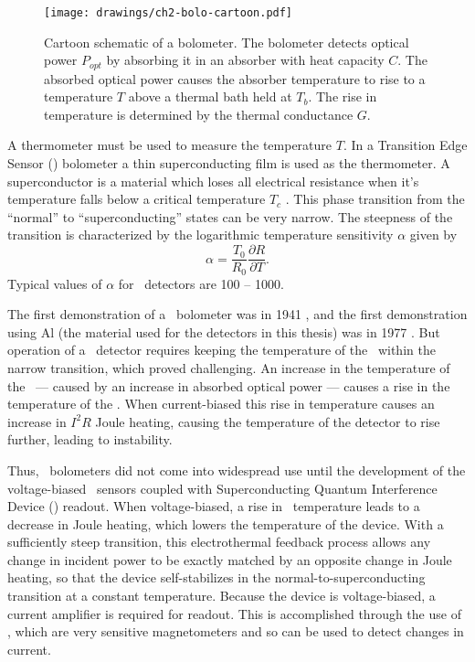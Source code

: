 \begin{figure*}
\centering
\texttt{[image: drawings/ch2-bolo-cartoon.pdf]}
\caption[Bolometer Schematic]{
  Cartoon schematic of a bolometer.
  The bolometer detects optical power $P_{opt}$ by absorbing it in an absorber with heat capacity $C$.
  The absorbed optical power causes the absorber temperature to rise to a temperature $T$ above a thermal bath held at $T_b$.
  The rise in temperature is determined by the thermal conductance $G$.
}
\label{fig:ch2-bolo-cartoon}
\end{figure*}

A thermometer must be used to measure the temperature $T$.
In a Transition Edge Sensor (\TES) bolometer a thin superconducting film is used as the thermometer.
A superconductor is a material which loses all electrical resistance when it's temperature falls below a critical temperature $T_c$ \cite{tinkham_introduction_1996}.
This phase transition from the ``normal'' to ``superconducting'' states can be very narrow.
The steepness of the transition is characterized by the logarithmic temperature sensitivity $\alpha$ given by
\begin{equation}
  \alpha = \frac{T_0}{R_0} \frac{\partial R}{\partial T}.
\end{equation}
Typical values of $\alpha$ for \TES\ detectors are 100 -- 1000.

The first demonstration of a \TES\ bolometer was in 1941 \cite{andrews_attenuated_1942}, and the first demonstration using Al (the material used for the detectors in this thesis) was in 1977 \cite{clarke_superconductive_1977}.
But operation of a \TES\ detector requires keeping the temperature of the \TES\ within the narrow transition, which proved challenging.
An increase in the temperature of the \TES\ --- caused by an increase in absorbed optical power --- causes a rise in the temperature of the \TES.
When current-biased this rise in temperature causes an increase in $I^2 R$ Joule heating, causing the temperature of the detector to rise further, leading to instability.

Thus, \TES\ bolometers did not come into widespread use until the development of the voltage-biased \TES\ sensors \cite{irwin_application_1995} coupled with Superconducting Quantum Interference Device (\SQUID) readout.
When voltage-biased, a rise in \TES\ temperature leads to a decrease in Joule heating, which lowers the temperature of the device.
With a sufficiently steep transition, this electrothermal feedback process allows any change in incident power to be exactly matched by an opposite change in Joule heating, so that the device self-stabilizes in the normal-to-superconducting transition at a constant temperature.
Because the device is voltage-biased, a current amplifier is required for readout.
This is accomplished through the use of \SQUIDs, which are very sensitive magnetometers and so can be used to detect changes in current.

